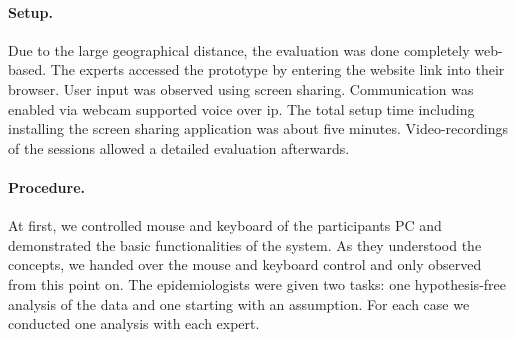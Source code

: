 \documentclass[journal]{style/vgtc} 			          %
\begin{document}
\paragraph{Setup.} Due to the large geographical distance, the evaluation was done completely web-based.
%
The experts accessed the prototype by entering the website link into their browser. %
%
%
User input was observed using screen sharing.
%
Communication was enabled via webcam supported voice over ip.
%
The total setup time including installing the screen sharing application was about five minutes.
%
Video-recordings of the sessions allowed a detailed evaluation afterwards.%
%
\paragraph{Procedure.}
At first, we controlled mouse and keyboard of the participants PC and demonstrated the basic functionalities of the system.
%
%
As they understood the concepts, we handed over the mouse and keyboard control and only observed from this point on.
%
The epidemiologists were given two tasks: one hypothesis-free analysis of the data and one starting with an assumption.
%
For each case we conducted one analysis with each expert.

\end{document}
